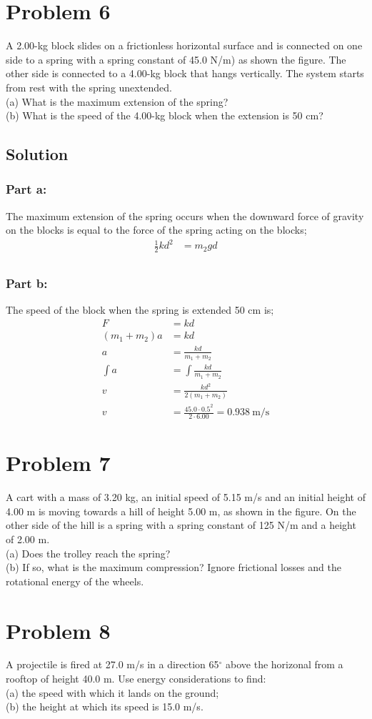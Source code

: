 \documentclass{article}
\begin{document}
\section*{Problem 6}
A 2.00-kg block slides on a frictionless horizontal surface and is connected on one side to a spring with a
spring constant of 45.0 N/m) as shown the figure. The other side is connected to a 4.00-kg block that hangs
vertically. The system starts from rest with the spring unextended. \\
(a) What is the maximum extension of the spring? \\
(b) What is the speed of the 4.00-kg block when the extension is 50 cm?

\subsection*{Solution}
\subsubsection*{Part a:}
The maximum extension of the spring occurs when the downward force of gravity on the blocks is equal to the force of the spring acting on the blocks;
\begin{align*}
	\frac{1}{2}kd^2 &= m_2gd \\
\end{align*}

\subsubsection*{Part b:}
The speed of the block when the spring is extended 50 cm is;
\begin{align*}
	F &= kd \\
	(m_1 + m_2)a &= kd \\
	a &= \frac{kd}{m_1 + m_2} \\
	\int a &= \int \frac{kd}{m_1 + m_2} \\
	v &= \frac{kd^2}{2\left( m_1 + m_2 \right)} \\
	v &= \frac{45.0 \cdot 0.5^2}{2 \cdot 6.00} = \boxed{0.938\ \text{m}/\text{s}}
\end{align*}

\section*{Problem 7}
A cart with a mass of 3.20 kg, an initial speed of 5.15 m/s and an initial height of 4.00 m is moving
towards a hill of height 5.00 m, as shown in the figure. On the other side of the hill is a spring with a spring
constant of 125 N/m and a height of 2.00 m. \\
(a) Does the trolley reach the spring? \\
(b) If so, what is the maximum compression? Ignore frictional losses and the rotational energy of the wheels.

\section*{Problem 8}
A projectile is fired at 27.0 m/s in a direction 65$^\circ$ above the horizonal from a rooftop of height 40.0 m. Use
energy considerations to find: \\
(a) the speed with which it lands on the ground; \\
(b) the height at which its speed is 15.0 m/s.
\end{document}
